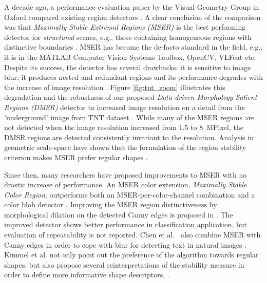 \documentclass[conference,compsoc]{IEEEtran}
\begin{document}
A decade ago, a performance evaluation paper by the Visual Geometry Group in Oxford compared existing region detectors \cite{Mikolajczyk:2005}. 
A clear conclusion of the comparison was that {\em  Maximally Stable Extremal Regions (MSER)} is the best performing detector for {\em structured} scenes, e.g., those containing homogeneous regions with distinctive boundaries \cite{Matas2002BMVC}. MSER has become the de-facto standard in the field, e.g., it is in the MATLAB Computer Vision Systems Toolbox, OpenCV, VLFeat etc. Despite its success, the detector has several drawbacks: it is sensitive to image blur; it produces nested and redundant regions and its performance degrades with the increase of image resolution \cite{CorRos2013}. Figure \ref{fig:tnt_zoom} illustrates this degradation and the robustness of our proposed {\em Data-driven Morphology Salient Regions (DMSR)} detector to increased image resolution on a detail from the 'underground' image from TNT dataset \cite{CorRos2013}. While many of the MSER regions are not detected when the image resolution increased from $1.5$ to $8$~MPixel, the DMSR regions are detected consistently invariant to the resolution. Analysis in geometric scale-space have shown that the formulation of the region stability criterion makes MSER prefer regular shapes \cite{Kimmel11}.

Since then, many researchers have proposed improvements to MSER with no drastic increase of performance. An MSER color extension, {\em Maximally Stable Color Region}, outperforms both an MSER-per-color-channel combination and a color blob detector \cite{Forssen07}. Improving the MSER region distinctiveness by morphological dilation on the detected Canny edges is proposed in \cite{Wang14}. The improved detector shows better performance in classification application, but evaluation of repeatability is not reported. 
Chen et al.~ also combine MSER with Canny edges in order to cope with blur for detecting text in natural images \cite{Chen11}.
Kimmel et al. not only point out the preference of the algorithm towards regular shapes, but also propose several reinterpretations of the stability measure in order to define more informative shape descriptors, \cite{Kimmel11}. 
\end{document}
